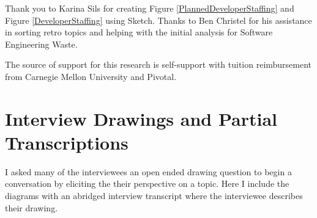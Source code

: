 \documentclass[oneside,letterpaper]{memoir}
\begin{document}
Thank you to Karina Sils for creating Figure \ref{PlannedDeveloperStaffing} and Figure \ref{DeveloperStaffing} using Sketch. Thanks to Ben Christel for his assistance in sorting retro topics and helping with the initial analysis for Software Engineering Waste.

The source of support for this research is self-support with tuition reimbursement from Carnegie Mellon University and Pivotal.



\newpage
\tableofcontents
\listoftables
\listoffigures

\mainmatter



% 
% 
% 










\appendix


\chapter{Interview Drawings and Partial Transcriptions}
\label{AppendixInterviews}
I asked many of the interviewees an open ended drawing question to begin a conversation by eliciting the their perspective on a topic. Here I include the diagrams with an abridged interview transcript where the interviewee describes their drawing.






% 
% 



\backmatter
\end{document}
